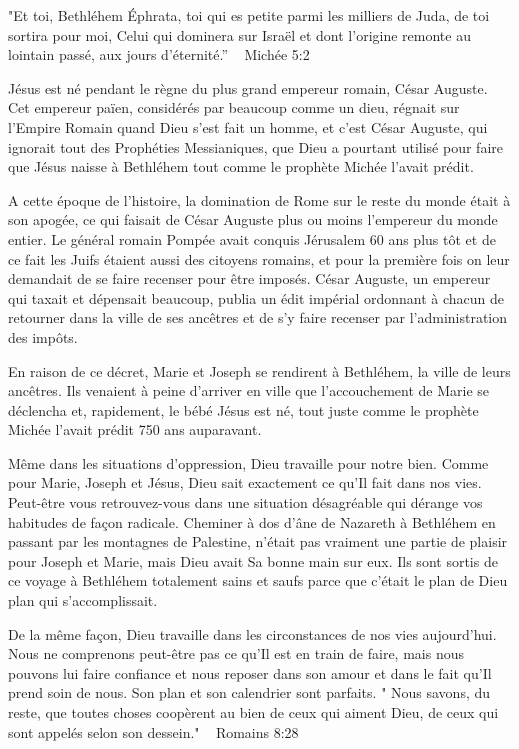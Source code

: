 

"Et toi, Bethléhem Éphrata, toi qui es petite parmi les milliers de Juda, de toi sortira pour moi, Celui qui dominera sur Israël et dont l’origine remonte au lointain passé, aux jours d’éternité.” ~ Michée 5:2

Jésus est né pendant le règne du plus grand empereur romain, César Auguste. Cet empereur païen, considérés par beaucoup comme un dieu, régnait sur l'Empire Romain quand Dieu s'est fait un homme, et c'est César Auguste, qui ignorait tout des Prophéties Messianiques, que Dieu a pourtant utilisé pour faire que Jésus naisse à Bethléhem tout comme le prophète Michée l'avait prédit.

A cette époque de l'histoire, la domination de Rome sur le reste du monde était à son apogée, ce qui faisait de César Auguste plus ou moins l'empereur du monde entier. Le général romain Pompée avait conquis Jérusalem 60 ans plus tôt et de ce fait les Juifs étaient aussi des citoyens romains, et pour la première fois on leur demandait de se faire recenser pour être imposés. César Auguste, un empereur qui taxait et dépensait beaucoup, publia un édit impérial ordonnant à chacun de retourner dans la ville de ses ancêtres et de s'y faire recenser par l'administration des impôts.

En raison de ce décret, Marie et Joseph se rendirent à Bethléhem, la ville de leurs ancêtres. Ils venaient à peine d'arriver en ville que l'accouchement de Marie se déclencha et, rapidement, le bébé Jésus est né, tout juste comme le prophète Michée l'avait prédit 750 ans auparavant.

Même dans les situations d'oppression, Dieu travaille pour notre bien. Comme pour Marie, Joseph et Jésus, Dieu sait exactement ce qu'Il fait dans nos vies. Peut-être vous retrouvez-vous dans une situation désagréable qui dérange vos habitudes de façon radicale. Cheminer à dos d'âne de Nazareth à Bethléhem en passant par les montagnes de Palestine, n'était pas vraiment une partie de plaisir pour Joseph et Marie, mais Dieu avait Sa bonne main sur eux. Ils sont sortis de ce voyage à Bethléhem totalement sains et saufs parce que c'était le plan de Dieu plan qui s'accomplissait.

De la même façon, Dieu travaille dans les circonstances de nos vies aujourd'hui. Nous ne comprenons peut-être pas ce qu'Il est en train de faire, mais nous pouvons lui faire confiance et nous reposer dans son amour et dans le fait qu'Il prend soin de nous. Son plan et son calendrier sont parfaits. " Nous savons, du reste, que toutes choses coopèrent au bien de ceux qui aiment Dieu, de ceux qui sont appelés selon son dessein." ~ Romains 8:28


